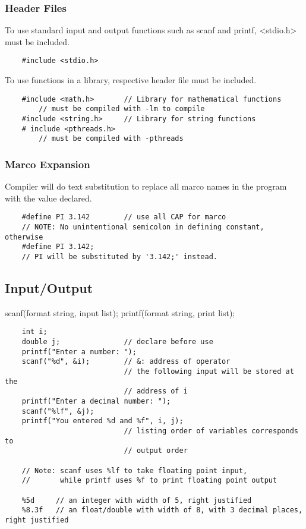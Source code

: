 \documentclass[12pt]{article} %
\begin{document}
\subsubsection{Header Files}
To use standard input and output functions such as scanf and printf, <stdio.h> must be included.
\begin{lstlisting}
    #include <stdio.h>
\end{lstlisting}
To use functions in a library, respective header file must be included.
\begin{lstlisting}
    #include <math.h>       // Library for mathematical functions   
        // must be compiled with -lm to compile
    #include <string.h>     // Library for string functions
    # include <pthreads.h>  
        // must be compiled with -pthreads
\end{lstlisting}

\subsubsection{Marco Expansion}
Compiler will do text substitution to replace all marco names in the program with the value declared.
\begin{lstlisting}
    #define PI 3.142        // use all CAP for marco
    // NOTE: No unintentional semicolon in defining constant, otherwise
    #define PI 3.142;
    // PI will be substituted by '3.142;' instead.
\end{lstlisting}

\subsection{Input/Output}
scanf(format string, input list);
printf(format string, print list);

\begin{lstlisting}
    int i;
    double j;               // declare before use
    printf("Enter a number: ");
    scanf("%d", &i);        // &: address of operator
                            // the following input will be stored at the 
                            // address of i
    printf("Enter a decimal number: ");
    scanf("%lf", &j);
    printf("You entered %d and %f", i, j);
                            // listing order of variables corresponds to 
                            // output order

    // Note: scanf uses %lf to take floating point input,
    //       while printf uses %f to print floating point output

    %5d     // an integer with width of 5, right justified
    %8.3f   // an float/double with width of 8, with 3 decimal places, right justified
\end{lstlisting}
\end{document}
